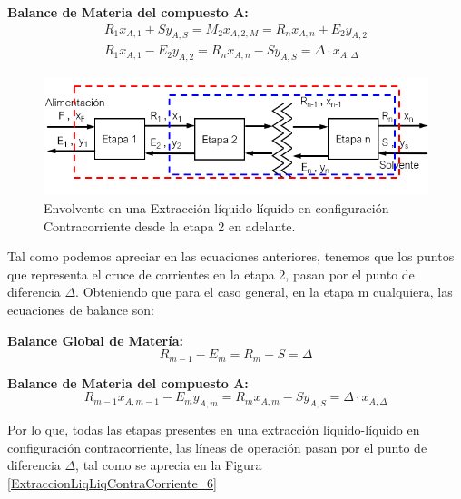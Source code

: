 \documentclass[11pt]{book}
\begin{document}
\textbf{Balance de Materia del compuesto A:}
\begin{align}
    \label{eq:ExtraccionLiqLiqContracorriente_8}
    R_1 x_{A,1} + S y_{A,S} = M_2 x_{A,2,M} = R_n x_{A,n} + E_2 y_{A,2} \\
     R_1 x_{A,1} - E_2 y_{A,2} = R_n x_{A,n} - S y_{A,S} = \Delta \cdot x_{A,\Delta}
\end{align}

\begin{figure}[H]
    \centering
    \includegraphics{img/LiquidoLiquido/ExtraccionLiqLiq_ContraCorriente_5.PNG}
    \caption{Envolvente en una Extracción líquido-líquido en configuración Contracorriente desde la etapa 2 en adelante.}
    \label{fig:ExtraccionLiqLiqContraCorriente_5}
\end{figure}


Tal como podemos apreciar en las ecuaciones anteriores, tenemos que los puntos que representa el cruce de corrientes en la etapa 2, pasan por el punto de diferencia $\Delta$. Obteniendo que para el caso general, en la etapa m cualquiera, las ecuaciones de balance son:

\textbf{Balance Global de Matería:}
\begin{equation}
    \label{eq:ExtraccionLiqLiqContracorriente_9}
    R_{m-1} - E_{m} = R_{m} - S = \Delta
\end{equation}
    
\textbf{Balance de Materia del compuesto A:}
\begin{equation}
    \label{eq:ExtraccionLiqLiqContracorriente_10}
    R_{m-1} x_{A,m-1} - E_m y_{A,m} = R_m x_{A,m} - S y_{A,S} = \Delta \cdot x_{A,\Delta}
\end{equation}

Por lo que, todas las etapas presentes en una extracción líquido-líquido en configuración contracorriente, las líneas de operación pasan por el punto de diferencia $\Delta$, tal como se aprecia en la Figura \ref{ExtraccionLiqLiqContraCorriente_6}
\end{document}
